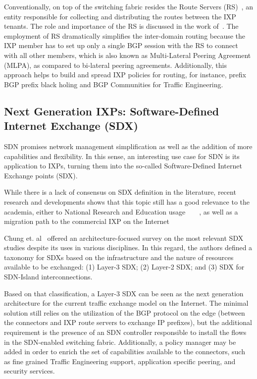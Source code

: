 \documentclass[conference]{IEEEtran/IEEEtran}
\begin{document}
Conventionally, on top of the switching fabric resides the Route Servers (RS)~\cite{rfc7947}, an entity responsible for collecting and distributing the routes between the IXP tenants. The role and importance of the RS is discussed in the work of~\cite{richter2014peering}. The employment of RS dramatically simplifies the inter-domain routing because the IXP member has to set up only a single BGP session with the RS to connect with all other members, which is also known as Multi-Lateral Peering Agreement (MLPA), as compared to bi-lateral peering agreements. Additionally, this approach helps to build and spread IXP policies for routing, for instance, prefix BGP prefix black holing and BGP Communities for Traffic Engineering.

\subsection{Next Generation IXPs: Software-Defined Internet Exchange (SDX)}
SDN promises network management simplification as well as the addition of more capabilities and flexibility. In this sense, an interesting use case for SDN is its application to IXPs, turning them into the so-called Software-Defined Internet Exchange points (SDX). 

While there is a lack of consensus on SDX definition in the literature, recent research and developments shows that this topic still has a good relevance to the academia, either to National Research and Education usage~\cite{chung2015atlanticwave}~\cite{ricci2016report}~\cite{ventre2016geant}~\cite{birkner2017sdx}, as well as a migration path to the commercial IXP on the Internet~\cite{chiesa2016inter}

Chung et. al~\cite{chung2016sdx} offered an architecture-focused survey on the most relevant SDX studies despite its uses in various disciplines. In this regard, the authors defined a taxonomy for SDXs based on the infrastructure and the nature of resources available to be exchanged: (1) Layer-3 SDX; (2) Layer-2 SDX; and (3) SDX for SDN-Island interconnections.

Based on that classification, a Layer-3 SDX can be seen as the next generation architecture for the current traffic exchange model on the Internet. The minimal solution still relies on the utilization of the BGP protocol on the edge (between the connectors and IXP route servers to exchange IP prefixes), but the additional requirement is the presence of an SDN controller responsible to install the flows in the SDN-enabled switching fabric. Additionally, a policy manager may be added in order to enrich the set of capabilities available to the connectors, such as fine grained Traffic Engineering support, application specific peering, and security services.
\end{document}
